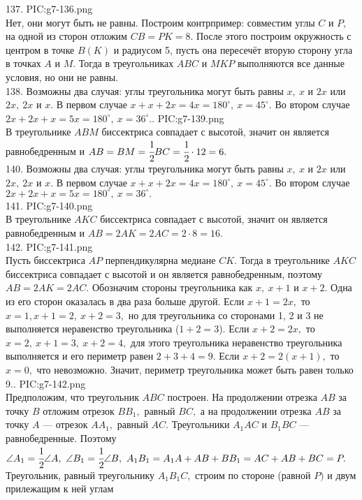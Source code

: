 137. {{PIC:g7-136.png}}\\
Нет, они могут быть не равны. Построим контрпример: совместим углы $C$ и $P,$ на одной из сторон отложим $CB=PK=8.$ После этого построим окружность с центром в точке $B(K)$ и радиусом 5, пусть она пересечёт вторую сторону угла в точках $A$ и $M.$ Тогда в треугольниках $ABC$ и $MKP$ выполняются все данные условия, но они не равны.\\
138. Возможны два случая: углы треугольника могут быть равны $x,\ x$ и $2x$ или $2x,\ 2x$ и $x.$ В первом случае $x+x+2x=4x=180^\circ,\ x=45^\circ.$ Во втором случае $2x+2x+x=5x=180^\circ,\ x=36^\circ.$\newpage{}. {{PIC:g7-139.png}}\\
В треугольнике $ABM$ биссектриса совпадает с высотой, значит он является равнобедренным и $AB=BM=\cfrac{1}{2}BC=\cfrac{1}{2}\cdot12=6.$\\
140. Возможны два случая: углы треугольника могут быть равны $x,\ x$ и $2x$ или $2x,\ 2x$ и $x.$ В первом случае $x+x+2x=4x=180^\circ,\ x=45^\circ.$ Во втором случае $2x+2x+x=5x=180^\circ,\ x=36^\circ.$\\
141. {{PIC:g7-140.png}}\\
В треугольнике $AKC$ биссектриса совпадает с высотой, значит он является равнобедренным и $AB=2AK=2AC=2\cdot8=16.$\\
142. {{PIC:g7-141.png}}\\
Пусть биссектриса $AP$ перпендикулярна медиане $CK.$ Тогда в треугольнике $AKC$ биссектриса совпадает с высотой и он является равнобедренным, поэтому $AB=2AK=2AC.$ Обозначим стороны треугольника как $x,\ x+1$ и $x+2.$ Одна из его сторон оказалась в два раза больше другой. Если $x+1=2x,$ то $x=1, x+1=2,\ x+2=3,$ но для треугольника со сторонами 1, 2 и 3 не выполняется неравенство треугольника ($1+2=3$). Если $x+2=2x,$ то $x=2,\ x+1=3,\ x+2=4,$ для этого треугольника неравенство треугольника выполняется и его периметр равен $2+3+4=9.$ Если $x+2=2(x+1),$ то $x=0,$ что невозможно. Значит, периметр треугольника может быть равен только 9.\newpage{}. {{PIC:g7-142.png}}\\
Предположим, что треугольник $ABC$ построен. На продолжении отрезка $AB$ за точку $B$ отложим отрезок $BB_1,$ равный $BC,$ а на продолжении отрезка $AB$ за точку $A$ --- отрезок $AA_1,$ равный $AC.$ Треугольники $A_1AC$ и $B_1BC$ --- равнобедренные. Поэтому  $\angle A_1 = \cfrac{1}{2} \angle A,\  \angle B_1 = \cfrac{1}{2} \angle B,\ A_1B_1 = A_1A + AB + BB_1 = AC + AB + BC = P.$ Треугольник, равный треугольнику $A_1B_1C,$ строим по стороне (равной $P)$ и двум прилежащим к ней углам
